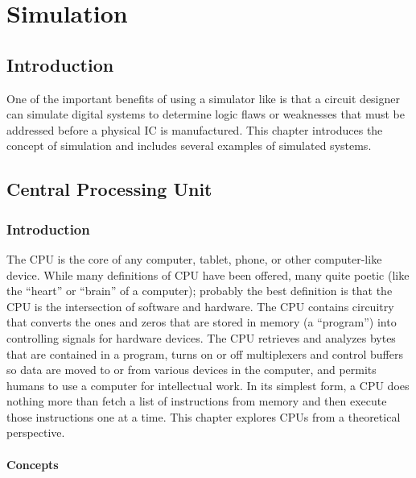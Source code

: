 \chapter{Simulation}\label{ch10}
\section{Introduction}

One of the important benefits of using a simulator like \Le is that a circuit designer can simulate digital systems to determine logic flaws or weaknesses that must be addressed before a physical \ac{IC} is manufactured. This chapter introduces the concept of simulation and includes several examples of simulated systems.

\section{Central Processing Unit}
\label{SIM:sec:cpu}

\subsection{Introduction}
\label{SIM:subsec:intro_to_cpu}

The \acf{CPU} is the core of any computer, tablet, phone, or other computer-like device. While many definitions of \ac{CPU} have been offered, many quite poetic (like the ``heart'' or ``brain'' of a computer); probably the best definition is that the \ac{CPU} is the intersection of software and hardware. The \ac{CPU} contains circuitry that converts the ones and zeros that are stored in memory (a ``program'') into controlling signals for hardware devices. The \ac{CPU} retrieves and analyzes bytes that are contained in a program, turns on or off multiplexers and control buffers so data are moved to or from various devices in the computer, and permits humans to use a computer for intellectual work. In its simplest form, a \ac{CPU} does nothing more than fetch a list of instructions from memory and then execute those instructions one at a time. This chapter explores \acp{CPU} from a theoretical perspective.

\subsubsection{Concepts}

